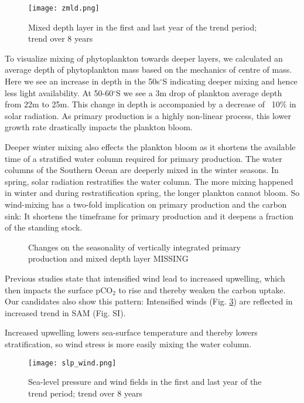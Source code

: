 \documentclass[12pt]{article}
\begin{document}
\begin{figure}
\texttt{[image: zmld.png]} %
\label{fig:zmld}
\caption{Mixed depth layer in the first and last year of the trend period; trend over 8 years}
\end{figure}

To visualize mixing of phytoplankton towards deeper layers, we calculated an average depth of phytoplankton mass based on the mechanics of centre of mass. Here we see an increase in depth in the 50s$^\circ$S indicating deeper mixing and hence less light availability. At 50-60$^\circ$S we see a 3m drop of plankton average depth from 22m to 25m. This change in depth is accompanied by a decrease of ~10\% in solar radiation. As primary production is a highly non-linear process, this lower growth rate drastically impacts the plankton bloom.


Deeper winter mixing also effects the plankton bloom as it shortens the available time of a stratified water column required for primary production. The water columns of the Southern Ocean are deeperly mixed in the winter seasons. In spring, solar radiation restratifies the water column. The more mixing happened in winter and during restratification spring, the longer plankton cannot bloom. So wind-mixing has a two-fold implication on primary production and the carbon sink: It shortens the timeframe for primary production and it deepens a fraction of the standing stock.

\begin{figure}
\label{fig:zmld_intpp_seasonality}
\caption{Changes on the seasonality of vertically integrated primary production and mixed depth layer {MISSING}}
\end{figure}


Previous studies state that intensified wind lead to increased upwelling, which then impacts the surface pCO$_2$ to rise and thereby weaken the carbon uptake. Our candidates also show this pattern: Intensified winds (Fig. \ref{fig:slp_wind}) are reflected in increased trend in SAM (Fig. SI). 

Increased upwelling lowers sea-surface temperature and thereby lowers stratification, so wind stress is more easily mixing the water column.

\begin{figure}
\texttt{[image: slp\_wind.png]} %
\label{fig:slp_wind}
\caption{Sea-level pressure and wind fields in the first and last year of the trend period; trend over 8 years}
\end{figure}
\end{document}
